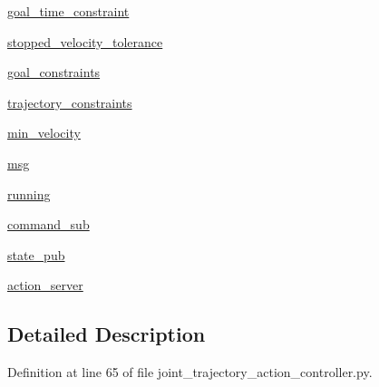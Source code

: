 \begin{DoxyCompactItemize}
\item 
\hyperlink{classdynamixel__controllers_1_1joint__trajectory__action__controller_1_1_joint_trajectory_action_controller_ad82649e3c1482fcb715d676bbf9e4c74}{goal\+\_\+time\+\_\+constraint}
\item 
\hyperlink{classdynamixel__controllers_1_1joint__trajectory__action__controller_1_1_joint_trajectory_action_controller_a1592da0d31846d08447fc8c229791755}{stopped\+\_\+velocity\+\_\+tolerance}
\item 
\hyperlink{classdynamixel__controllers_1_1joint__trajectory__action__controller_1_1_joint_trajectory_action_controller_ad2c6335c919957f5689db2b6c29df48d}{goal\+\_\+constraints}
\item 
\hyperlink{classdynamixel__controllers_1_1joint__trajectory__action__controller_1_1_joint_trajectory_action_controller_ad55b9c0f074aabab1c836e09a018a1fb}{trajectory\+\_\+constraints}
\item 
\hyperlink{classdynamixel__controllers_1_1joint__trajectory__action__controller_1_1_joint_trajectory_action_controller_aa2ceaafb637e600a3595665edac2123b}{min\+\_\+velocity}
\item 
\hyperlink{classdynamixel__controllers_1_1joint__trajectory__action__controller_1_1_joint_trajectory_action_controller_ae0386896abcb73f639f3b9c9348149a6}{msg}
\item 
\hyperlink{classdynamixel__controllers_1_1joint__trajectory__action__controller_1_1_joint_trajectory_action_controller_a392cae3f694bea4fe3a4f0ce67fb8194}{running}
\item 
\hyperlink{classdynamixel__controllers_1_1joint__trajectory__action__controller_1_1_joint_trajectory_action_controller_a7c8773ac507807ccd956cc8b2ced1af8}{command\+\_\+sub}
\item 
\hyperlink{classdynamixel__controllers_1_1joint__trajectory__action__controller_1_1_joint_trajectory_action_controller_a3ed863b4140a03d0e67fc79c79d80705}{state\+\_\+pub}
\item 
\hyperlink{classdynamixel__controllers_1_1joint__trajectory__action__controller_1_1_joint_trajectory_action_controller_aa40ddacfeb4a25f65ddb6aeb7b1526b3}{action\+\_\+server}
\end{DoxyCompactItemize}


\subsection{Detailed Description}


Definition at line 65 of file joint\+\_\+trajectory\+\_\+action\+\_\+controller.\+py.



